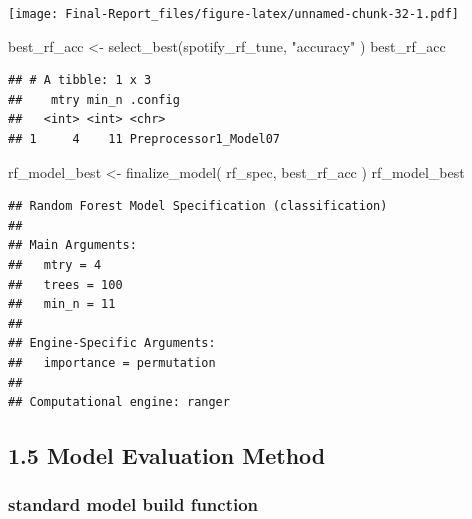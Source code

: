 \documentclass[
]{article}
\newenvironment{Shaded}{\begin{snugshade}}{\end{snugshade}}
\newcommand{\FunctionTok}[1]{\textcolor[rgb]{0.00,0.00,0.00}{#1}}
\newcommand{\NormalTok}[1]{#1}
\newcommand{\OtherTok}[1]{\textcolor[rgb]{0.56,0.35,0.01}{#1}}
\newcommand{\StringTok}[1]{\textcolor[rgb]{0.31,0.60,0.02}{#1}}
\begin{document}
\texttt{[image: Final-Report\_files/figure-latex/unnamed-chunk-32-1.pdf]}

\begin{Shaded}
\begin{Highlighting}[]
\NormalTok{best\_rf\_acc }\OtherTok{\textless{}{-}} \FunctionTok{select\_best}\NormalTok{(spotify\_rf\_tune, }\StringTok{"accuracy"}\NormalTok{ )}
\NormalTok{best\_rf\_acc}
\end{Highlighting}
\end{Shaded}

\begin{verbatim}
## # A tibble: 1 x 3
##    mtry min_n .config              
##   <int> <int> <chr>                
## 1     4    11 Preprocessor1_Model07
\end{verbatim}

\begin{Shaded}
\begin{Highlighting}[]
\NormalTok{rf\_model\_best }\OtherTok{\textless{}{-}} \FunctionTok{finalize\_model}\NormalTok{( rf\_spec, best\_rf\_acc )}
\NormalTok{rf\_model\_best}
\end{Highlighting}
\end{Shaded}

\begin{verbatim}
## Random Forest Model Specification (classification)
## 
## Main Arguments:
##   mtry = 4
##   trees = 100
##   min_n = 11
## 
## Engine-Specific Arguments:
##   importance = permutation
## 
## Computational engine: ranger
\end{verbatim}

\hypertarget{model-evaluation-method}{%
\subsection{1.5 Model Evaluation Method}\label{model-evaluation-method}}

\hypertarget{standard-model-build-function}{%
\subsubsection{standard model build
function}\label{standard-model-build-function}}
\end{document}
